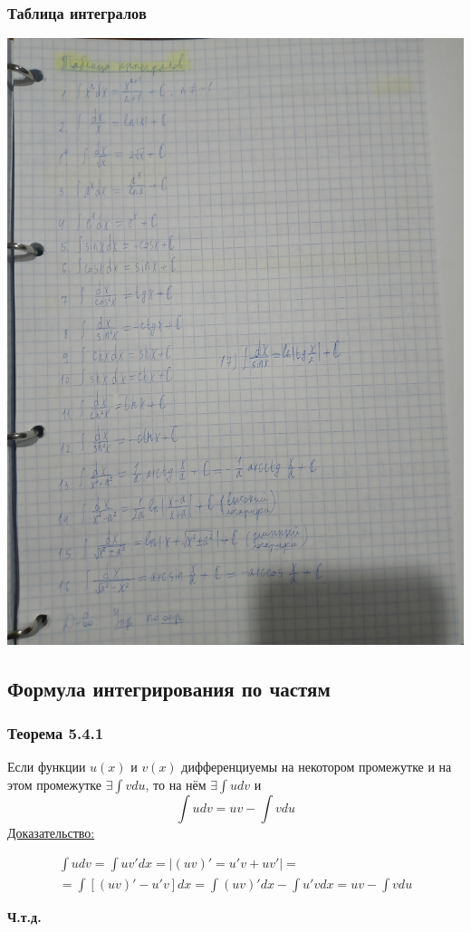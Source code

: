 \documentclass[12pt]{article}
\let\ORIincludegraphics\includegraphics
\renewcommand{\includegraphics}[2][]{\ORIincludegraphics[scale=0.65,#1]{#2}}
\begin{document}
    \subsubsection*{Таблица интегралов}
    \includegraphics[width=0.7\linewidth,keepaspectratio]{5.3.1.png}

    \subsection{Формула интегрирования по частям}
    \subsubsection*{Теорема 5.4.1}\label{th:5.4.1}
    Если функции $u(x)$ и $v(x)$ дифференциуемы на некотором промежутке и на этом промежутке $\exists \int vdu$, то на нём $\exists \int udv$ и
    \[ \boxed{\int udv = uv - \int vdu} \]
    \underline{Доказательство:}
    \begin{adjustwidth}{1.5em}{1.5em}
        \begin{gather*}
            \int udv = \int uv'dx = \left| (uv)' = u'v + uv' \right| =\\
            = \int [(uv)' - u'v]dx = \int (uv)'dx - \int u'vdx = uv - \int vdu
        \end{gather*}
        \begin{center}
            \textbf{Ч.т.д.}
        \end{center}
    \end{adjustwidth}
\end{document}

